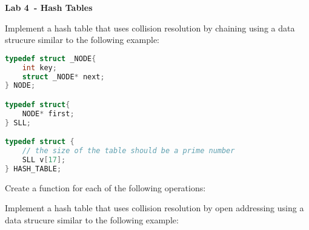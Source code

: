 \documentclass{exam}
\newcommand\labnr{4}
\newcommand\lab{Lab \labnr\ - Hash Tables}
\newcommand\lvlez{$\bigstar$}
\newcommand\lvlmed{\lvlez\lvlez}
\begin{document}
\begin{center}
    \vspace*{0cm}
    \bfseries\LARGE
    \lab
    \vspace*{1cm}
\end{center}


\begin{questions}
\question Implement a hash table that uses collision resolution by chaining using a data strucure similar to the following example:

\begin{lstlisting}[language=C]
typedef struct _NODE{
    int key;
    struct _NODE* next;
} NODE;

typedef struct{
    NODE* first;   
} SLL;

typedef struct {
    // the size of the table should be a prime number 
    SLL v[17];
} HASH_TABLE;
\end{lstlisting}





Create a function for each of the following operations:

\question Implement a hash table that uses collision resolution by open addressing using a data strucure similar to the following example:


\end{questions}
\end{document}
